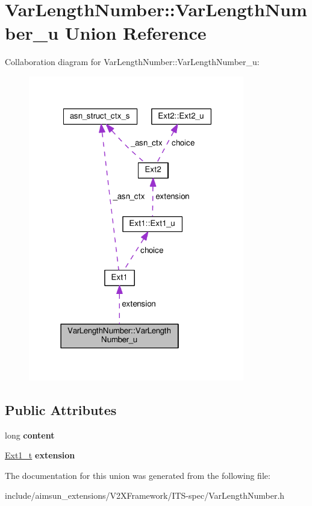 \hypertarget{unionVarLengthNumber_1_1VarLengthNumber__u}{}\section{Var\+Length\+Number\+:\+:Var\+Length\+Number\+\_\+u Union Reference}
\label{unionVarLengthNumber_1_1VarLengthNumber__u}


Collaboration diagram for Var\+Length\+Number\+:\+:Var\+Length\+Number\+\_\+u\+:\nopagebreak
\begin{figure}[H]
\begin{center}
\leavevmode
\includegraphics[width=267pt]{unionVarLengthNumber_1_1VarLengthNumber__u__coll__graph}
\end{center}
\end{figure}
\subsection*{Public Attributes}
\begin{DoxyCompactItemize}
\item 
long {\bfseries content}\hypertarget{unionVarLengthNumber_1_1VarLengthNumber__u_a3bac1cf03281953b5e841745066db8e5}{}\label{unionVarLengthNumber_1_1VarLengthNumber__u_a3bac1cf03281953b5e841745066db8e5}

\item 
\hyperlink{structExt1}{Ext1\+\_\+t} {\bfseries extension}\hypertarget{unionVarLengthNumber_1_1VarLengthNumber__u_ad580fef80b4675ab8ab5e9cd2eee0727}{}\label{unionVarLengthNumber_1_1VarLengthNumber__u_ad580fef80b4675ab8ab5e9cd2eee0727}

\end{DoxyCompactItemize}


The documentation for this union was generated from the following file\+:\begin{DoxyCompactItemize}
\item 
include/aimsun\+\_\+extensions/\+V2\+X\+Framework/\+I\+T\+S-\/spec/Var\+Length\+Number.\+h\end{DoxyCompactItemize}
